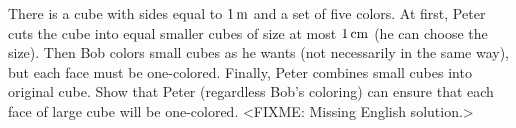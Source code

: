 \problem{}
There is a cube with sides equal to $1 \text{\,m}$ and a set of five colors.
At first, Peter cuts the cube into equal smaller cubes of size at most $1 \text{\,cm}$
(he can choose the size).
Then Bob colors small cubes as he wants (not necessarily in the same way), but each face must be 	
one-colored.
Finally, Peter combines small cubes into original cube.
Show that Peter (regardless Bob's coloring)  can ensure that each face of large cube will be 	
one-colored. 
\solution
<FIXME: Missing English solution.>
\endproblem
